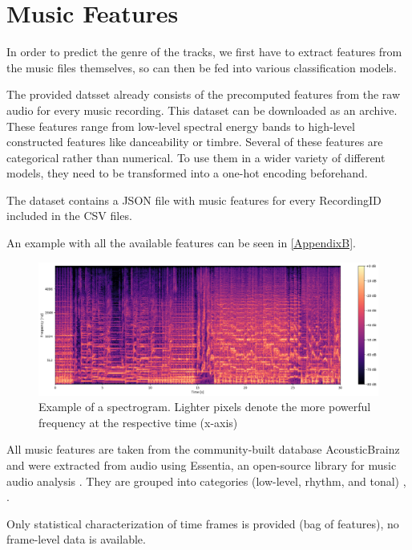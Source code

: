 \section{Music Features}

In order to predict the genre of the tracks, we first have to extract
features from the music files themselves, so can then be fed into various
classification models.

The provided datsset already consists of the precomputed features from the raw audio for every music recording. 
This dataset can be downloaded as an archive.
These features range from low-level spectral energy bands to high-level
constructed features like danceability or timbre.
Several of these features are categorical rather than numerical. 
To use them in a wider variety
of different models, they need to be transformed into a one-hot encoding beforehand. 

The dataset contains a JSON\cite{json} file with music features for every RecordingID included in the CSV files. 

An example with all the available features can be seen in \ref{AppendixB}.

\begin{figure}[!htb]
    \centering
    \includegraphics[width=1.0\textwidth]{Figures/freq.png}
    \decoRule
    \caption[Spectogram Example]{Example of a spectrogram. Lighter pixels denote the more powerful frequency at the respective time (x-axis)}
    \label{fig:spectrogram}
\end{figure}


All music features are taken from the community-built database AcousticBrainz and were extracted from audio using Essentia, an open-source library for music audio analysis \cite{essentia}. 
They are grouped into categories (low-level, rhythm, and tonal) \cite{essentiafeatures}, \cite{Bogdanov2013}. 

Only statistical characterization of time frames is provided (bag of features), no frame-level data is available.

